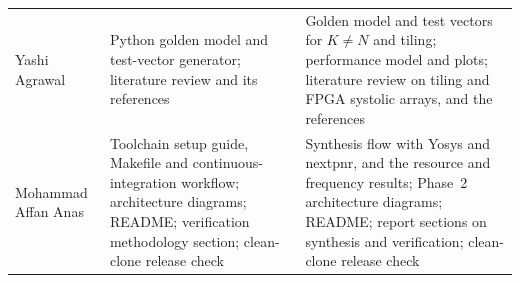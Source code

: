 \begin{table}[t]
\begin{tabular}{@{}>{\raggedright\arraybackslash}p{}>{\raggedright\arraybackslash}p{}>{\raggedright\arraybackslash}p{}@{}}
\addlinespace
Yashi Agrawal & Python golden model and test-vector generator; literature review and its references & Golden model and test vectors for $K \neq N$ and tiling; performance model and plots; literature review on tiling and FPGA systolic arrays, and the references \\
\addlinespace
Mohammad Affan Anas & Toolchain setup guide, Makefile and continuous-integration workflow; architecture diagrams; README; verification methodology section; clean-clone release check & Synthesis flow with Yosys and nextpnr, and the resource and frequency results; Phase~2 architecture diagrams; README; report sections on synthesis and verification; clean-clone release check \\
\bottomrule
\end{tabular}
\end{table}
